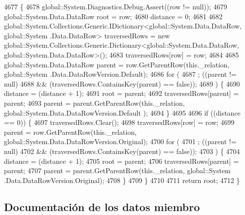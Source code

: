 \begin{DoxyCode}
4677                                                                                                        \{
4678                 global::System.Diagnostics.Debug.Assert((row != null));
4679                 global::System.Data.DataRow root = row;
4680                 distance = 0;
4681 
4682                 global::System.Collections.Generic.IDictionary<global::System.Data.DataRow, global::System
      .Data.DataRow> traversedRows = \textcolor{keyword}{new} global::System.Collections.Generic.Dictionary<global::System.Data.DataRow,
       global::System.Data.DataRow>();
4683                 traversedRows[row] = row;
4684 
4685                 global::System.Data.DataRow parent = row.GetParentRow(this.\_relation, global::System
      .Data.DataRowVersion.Default);
4686                 \textcolor{keywordflow}{for} (
4687                 ; ((parent != null) 
4688                             && (traversedRows.ContainsKey(parent) == \textcolor{keyword}{false})); 
4689                 ) \{
4690                     distance = (distance + 1);
4691                     root = parent;
4692                     traversedRows[parent] = parent;
4693                     parent = parent.GetParentRow(this.\_relation, global::System.Data.DataRowVersion.Default
      );
4694                 \}
4695 
4696                 \textcolor{keywordflow}{if} ((distance == 0)) \{
4697                     traversedRows.Clear();
4698                     traversedRows[row] = row;
4699                     parent = row.GetParentRow(this.\_relation, global::System.Data.DataRowVersion.Original);
4700                     \textcolor{keywordflow}{for} (
4701                     ; ((parent != null) 
4702                                 && (traversedRows.ContainsKey(parent) == \textcolor{keyword}{false})); 
4703                     ) \{
4704                         distance = (distance + 1);
4705                         root = parent;
4706                         traversedRows[parent] = parent;
4707                         parent = parent.GetParentRow(this.\_relation, global::System
      .Data.DataRowVersion.Original);
4708                     \}
4709                 \}
4710 
4711                 \textcolor{keywordflow}{return} root;
4712             \}
\end{DoxyCode}


\subsection{Documentación de los datos miembro}
